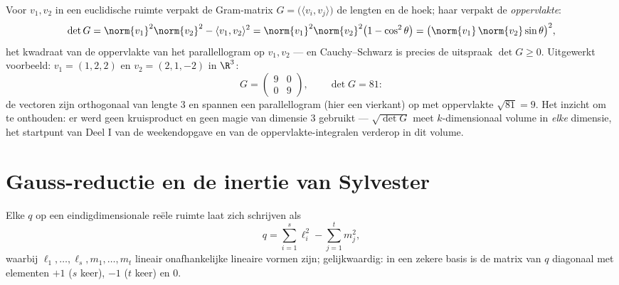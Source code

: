 \begin{example}\label{ex:b2:quadratic:gramarea}
Voor $v_1, v_2$ in een euclidische ruimte verpakt de
Gram-matrix $G = \bigl(\langle v_i, v_j\rangle\bigr)$ de lengten
en de hoek; haar  verpakt de \emph{oppervlakte}:
\[
\det G = \norm{v_1}^2\norm{v_2}^2 - \langle v_1, v_2\rangle^2
= \norm{v_1}^2\norm{v_2}^2\bigl(1 - \cos^2\theta\bigr)
= \bigl(\norm{v_1}\,\norm{v_2}\sin\theta\bigr)^2 ,
\]
het kwadraat van de oppervlakte van het parallellogram op $v_1,
v_2$ --- en Cauchy--Schwarz is precies de uitspraak $\det G \geq
0$. Uitgewerkt voorbeeld: $v_1 = (1, 2, 2)$ en $v_2 = (2, 1, -2)$
in $\R^3$:
\[
G = \begin{pmatrix} 9 & 0\\ 0 & 9 \end{pmatrix},
\qquad
\det G = 81 :
\]
de vectoren zijn orthogonaal van lengte $3$ en spannen een
parallellogram (hier een vierkant) op met oppervlakte $\sqrt{81} =
9$. Het inzicht om te onthouden: er werd geen kruisproduct en geen
magie van dimensie $3$ gebruikt --- $\sqrt{\det G}$ meet
$k$-dimensionaal volume in \emph{elke} dimensie, het startpunt van
Deel I van de weekendopgave en van de oppervlakte-integralen
verderop in dit volume.
\end{example}

\section{Gauss-reductie en de inertie van Sylvester}

\begin{theorem}\label{thm:b2:quadratic:gauss}
Elke  $q$ op een eindigdimensionale reële ruimte
laat zich schrijven als
\[
q = \sum_{i=1}^{s} \ell_i^2 - \sum_{j=1}^{t} m_j^2 ,
\]
waarbij $\ell_1, \dots, \ell_s, m_1, \dots, m_t$ lineair
onafhankelijke lineaire vormen zijn; gelijkwaardig: in een zekere
basis is de matrix van $q$ diagonaal met elementen $+1$ ($s$ keer),
$-1$ ($t$ keer) en $0$.
\end{theorem}

